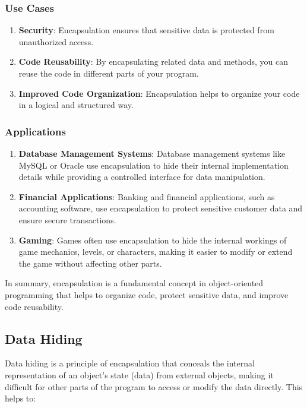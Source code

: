 \documentclass{book}
\begin{document}
\subsubsection{Use Cases}

\begin{enumerate}
	\item \textbf{Security}: Encapsulation ensures that sensitive data is protected from unauthorized access.
	\item \textbf{Code Reusability}: By encapsulating related data and methods, you can reuse the code in different parts of your program.
	\item \textbf{Improved Code Organization}: Encapsulation helps to organize your code in a logical and structured way.
\end{enumerate}

\subsubsection{Applications}

\begin{enumerate}
	\item \textbf{Database Management Systems}: Database management systems like MySQL or Oracle use encapsulation to hide their internal implementation details while providing a controlled interface for data manipulation.
	\item \textbf{Financial Applications}: Banking and financial applications, such as accounting software, use encapsulation to protect sensitive customer data and ensure secure transactions.
	\item \textbf{Gaming}: Games often use encapsulation to hide the internal workings of game mechanics, levels, or characters, making it easier to modify or extend the game without affecting other parts.
\end{enumerate}

In summary, encapsulation is a fundamental concept in object-oriented programming that helps to organize code, protect sensitive data, and improve code reusability.
\subsection{Data Hiding}
Data hiding is a principle of encapsulation that conceals the internal representation of an object's state (data) from external objects, making it difficult for other parts of the program to access or modify the data directly. This helps to:
\end{document}
